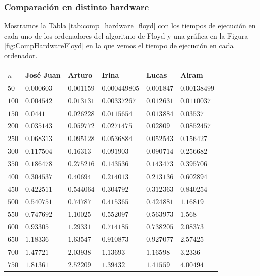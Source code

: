 \documentclass[12pt]{article}
\begin{document}
    \subsubsection{Comparación en distinto hardware}
    Mostramos la Tabla \ref{tab:comp_hardware_floyd} con los tiempos de ejecución en cada uno de los ordenadores del algoritmo de Floyd y una gráfica en la Figura \ref{fig:CompHardwareFloyd} en la que vemos el tiempo de ejecución en cada ordenador.
    \begin{table}
        \centering
        \begin{tabular}{|l|l|l|l|l|l|}
            \hline
            $n$ & José Juan & Arturo & Irina & Lucas & Airam \\
            \hline
            $50$ & $0.000603$ & $0.001159$ & $0.000449805$ & $0.001847$ & $0.00138499$ \\
            $100$ & $0.004542$ & $0.013131$ & $0.00337267$ & $0.012631$ & $0.0110037$ \\
            $150$ & $0.0441$ & $0.026228$ & $0.0115654$ & $0.013884$ & $0.03537$ \\
            $200$ & $0.035143$ & $0.059772$ & $0.0271475$ & $0.02809$ & $0.0852457$ \\
            $250$ & $0.068313$ & $0.095128$ & $0.0536884$ & $0.052543$ & $0.156427$ \\
            $300$ & $0.117504$ & $0.16313$ & $0.091903$ & $0.090714$ & $0.256682$ \\
            $350$ & $0.186478$ & $0.275216$ & $0.143536$ & $0.143473$ & $0.395706$ \\
            $400$ & $0.304537$ & $0.40694$ & $0.214013$ & $0.213136$ & $0.602894$ \\
            $450$ & $0.422511$ & $0.544064$ & $0.304792$ & $0.312363$ & $0.840254$ \\
            $500$ & $0.540751$ & $0.74787$ & $0.415365$ & $0.424881$ & $1.16819$ \\
            $550$ & $0.747692$ & $1.10025$ & $0.552097$ & $0.563973$ & $1.568$ \\
            $600$ & $0.93305$ & $1.29331$ & \underline{$0.714185$} & $0.738205$ & \underline{$2.08373$} \\
            $650$ & $1.18336$ & $1.63547$ & $0.910873$ & $0.927077$ & $2.57425$ \\
            $700$ & $1.47721$ & $2.03938$ & $1.13693$ & $1.16598$ & $3.2336$ \\
            $750$ & $1.81361$ & $2.52209$ & $1.39432$ & $1.41559$ & $4.00494$ \\

\end{tabular}
\end{table}
\end{document}
